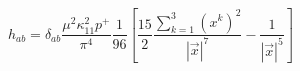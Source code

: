 \begin{equation}
h_{ab}=\delta_{ab}\frac{\mu^2\kappa_{11}^2p^+}{\pi^4} \frac{1}{96}
\left[\frac{15}{2}\frac{\sum_{k=1}^3(x^k)^2}{|\vec{x}|^7}
-\frac{1}{|\vec{x}|^5} \right]\label{hab}
\end{equation}

